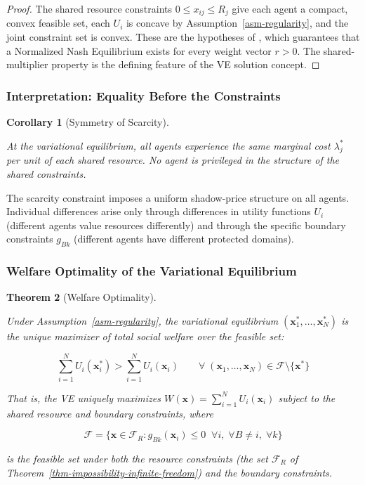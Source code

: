 \documentclass[11pt]{article}
\theoremstyle{plain}
\newtheorem{theorem}{Theorem}
\newtheorem{corollary}[theorem]{Corollary}
\theoremstyle{definition}
\theoremstyle{remark}
\let\origsubsubsection\subsubsection
\renewcommand{\subsubsection}{\needspace{4\baselineskip}\origsubsubsection}
\begin{document}
\begin{proof}
The shared resource constraints $0 \leq x_{ij} \leq R_j$ give each agent a compact, convex feasible set, each $U_i$ is concave by Assumption~\ref{asm-regularity}, and the joint constraint set is convex. These are the hypotheses of \citep[Theorem 3]{Rosen1965}, which guarantees that a Normalized Nash Equilibrium exists for every weight vector $r > 0$. The shared-multiplier property is the defining feature of the VE solution concept.
\end{proof}

\subsubsection{Interpretation: Equality Before the
Constraints}\label{interpretation-equality-before-the-constraints}

\begin{corollary}[Symmetry of Scarcity]
\label{cor-symmetry-scarcity}

At the variational equilibrium, all agents experience the same marginal cost $\lambda_j^*$ per unit of each shared resource. No agent is privileged in the structure of the shared constraints.
\end{corollary}

The scarcity constraint imposes a uniform shadow-price structure on all
agents. Individual differences arise only through differences in utility
functions \(U_i\) (different agents value resources differently) and
through the specific boundary constraints \(g_{Bk}\) (different agents
have different protected domains).

\subsubsection{Welfare Optimality of the Variational
Equilibrium}\label{welfare-optimality-of-the-variational-equilibrium}

\begin{theorem}[Welfare Optimality]
\label{thm-welfare-optimality}

Under Assumption~\ref{asm-regularity}, the variational equilibrium $(\mathbf{x}_1^*, \ldots, \mathbf{x}_N^*)$ is the unique maximizer of total social welfare over the feasible set:

$$\sum_{i=1}^{N} U_i(\mathbf{x}_i^*) > \sum_{i=1}^{N} U_i(\mathbf{x}_i) \qquad \forall \; (\mathbf{x}_1, \ldots, \mathbf{x}_N) \in \mathcal{F} \setminus \{\mathbf{x}^*\}$$

That is, the VE uniquely maximizes $W(\mathbf{x}) = \sum_{i=1}^{N} U_i(\mathbf{x}_i)$ subject to the shared resource and boundary constraints, where

$$\mathcal{F} = \{\mathbf{x} \in \mathcal{F}_R : g_{Bk}(\mathbf{x}_i) \leq 0 \;\; \forall i, \; \forall B \neq i, \; \forall k\}$$

is the feasible set under both the resource constraints (the set $\mathcal{F}_R$ of Theorem~\ref{thm-impossibility-infinite-freedom}) and the boundary constraints.
\end{theorem}
\end{document}
